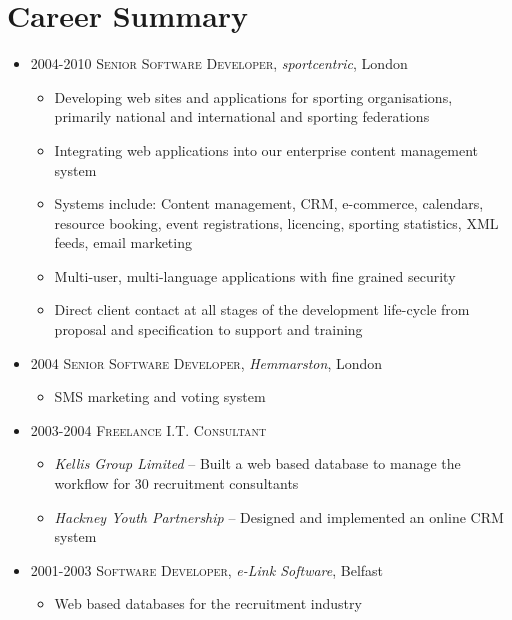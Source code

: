 \documentclass[a4paper,12pt]{article}
\begin{document}
\section*{Career Summary}
\begin{itemize}
  \item 2004-2010	\textsc{Senior Software Developer}, \emph{sportcentric}, London
    \begin{itemize}
      \item Developing web sites and applications for sporting organisations, primarily national and international and sporting federations
      \item Integrating web applications into our enterprise content management system
      \item Systems include: Content management, CRM, e-commerce, calendars, resource booking, event registrations, licencing, sporting statistics, XML feeds, email marketing
      \item Multi-user, multi-language applications with fine grained security
      \item Direct client contact at all stages of the development life-cycle from proposal and specification to support and training
    \end{itemize} 
  \item 2004 \textsc{Senior Software Developer}, \emph{Hemmarston}, London
    \begin{itemize}
      \item SMS marketing and voting system
    \end{itemize}
  \item 2003-2004	\textsc{Freelance I.T. Consultant} 
    \begin{itemize}
      \item \emph{Kellis Group Limited} – Built a web based database to manage the workflow for 30 recruitment consultants
      \item \emph{Hackney Youth Partnership} – Designed and implemented an online CRM system
    \end{itemize}
  \item 2001-2003	\textsc{Software Developer}, \emph{e-Link Software}, Belfast
    \begin{itemize}
      \item Web based databases for the recruitment industry
    \end{itemize}
\end{itemize} 
\end{document}
